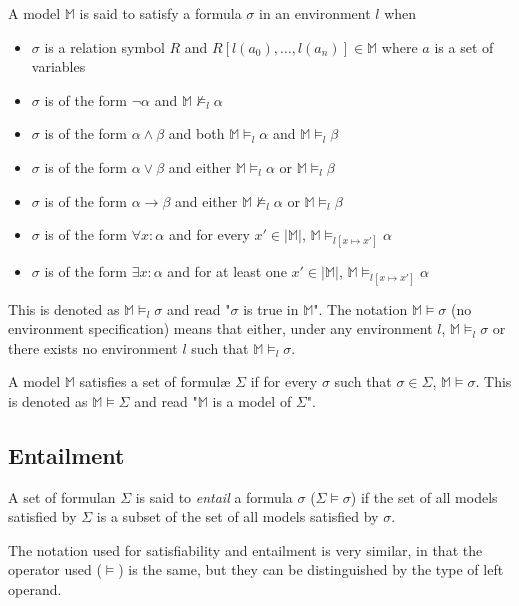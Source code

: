 		A model $\mathbb{M}$ is said to satisfy a formula $\sigma$ in an
		environment $l$ when
		\begin{itemize}
		\item $\sigma$ is a relation symbol $R$ and $R[l(a_0) , \ldots , l(a_n)] \in \mathbb{M}$ where $a$ is a set of variables
		\item $\sigma$ is of the form $\neg\alpha$ and $\mathbb{M} \not\models_l \alpha$
		\item $\sigma$ is of the form $\alpha\wedge\beta$ and both $\mathbb{M} \models_l \alpha$ and $\mathbb{M} \models_l \beta$
		\item $\sigma$ is of the form $\alpha\vee\beta$ and either $\mathbb{M} \models_l \alpha$ or $\mathbb{M} \models_l \beta$
		\item $\sigma$ is of the form $\alpha\to\beta$ and either $\mathbb{M} \not\models_l \alpha$ or $\mathbb{M} \models_l \beta$
		\item $\sigma$ is of the form $\forall x : \alpha$  and for every $x' \in |\mathbb{M}|$, $\mathbb{M} \models_{l[x \mapsto x']} \alpha$
		\item $\sigma$ is of the form $\exists x : \alpha$  and for at least one $x' \in |\mathbb{M}|$, $\mathbb{M} \models_{l[x \mapsto x']} \alpha$
		\end{itemize}
		This is denoted as $\mathbb{M} \models_l \sigma$ and read "$\sigma$ is
		true in $\mathbb{M}$". The notation $\mathbb{M} \models \sigma$ (no
		environment specification) means that either, under any environment
		$l$, $\mathbb{M} \models_l \sigma$ or there exists no environment $l$
		such that $\mathbb{M} \models_l \sigma$.

		A model $\mathbb{M}$ satisfies a set of formul{\ae} $\Sigma$ if for every
		$\sigma$ such that $\sigma \in \Sigma$, $\mathbb{M} \models \sigma$.
		This is denoted as $\mathbb{M} \models \Sigma$ and read "$\mathbb{M}$
		is a model of $\Sigma$".

	\subsection{Entailment}

		A set of formulan $\Sigma$ is said to \emph{entail} a formula $\sigma$
		($\Sigma \models \sigma$) if the set of all models satisfied by
		$\Sigma$ is a subset of the set of all models satisfied by $\sigma$.

		The notation used for satisfiability and entailment is very similar, in
		that the operator used ($\models$) is the same, but they can be
		distinguished by the type of left operand.

